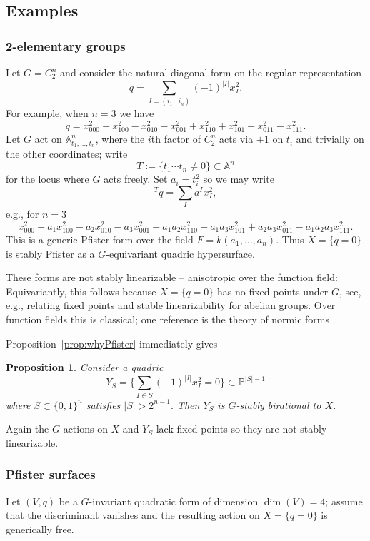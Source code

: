 \documentclass[12pt]{amsart}
\numberwithin{equation}{section}
\newcommand{\bA}{\mathbb{A}}
\newcommand{\bP}{\mathbb{P}}
\theoremstyle{plain}
\newtheorem{prop}{Proposition}[section]
\theoremstyle{definition}
\theoremstyle{remark}
\begin{document}
\subsection*{Examples} 
\label{sect:ASPF}

\subsubsection*{2-elementary groups}
Let $G=C_2^n$ and consider the natural diagonal form
on the regular representation
$$q=\sum_{I=(i_1\ldots i_n)}(-1)^{|I|} x_I^2.$$
For example, when $n=3$ we have
$$q = x_{000}^2 - x_{100}^2 - x_{010}^2 - x_{001}^2
+ x_{110}^2 + x_{101}^2 + x_{011}^2 - x_{111}^2.$$
Let $G$ act on $\bA^n_{t_1,\ldots,t_n}$, where the $i$th factor
of $C_2^n$ acts via $\pm 1$ on $t_i$ and trivially on the
other coordinates; write 
$$T:=\{t_1\cdots t_n \neq 0\}\subset \bA^n$$
for the locus where $G$ acts freely. Set $a_i=t_i^2$ so we may write
$${ }^Tq = \sum_I a^I x_I^2,$$
e.g., for $n=3$
$$
x_{000}^2 - a_1 x_{100}^2 - a_2x_{010}^2 - a_3x_{001}^2
+ a_1a_2x_{110}^2 + a_1a_3x_{101}^2 + a_2a_3x_{011}^2 - 
a_1a_2a_3 x_{111}^2.
$$
This is a generic Pfister form over the field $F=k(a_1,\ldots,a_n)$.
Thus $X=\{q=0\}$ is stably Pfister as a $G$-equivariant
quadric hypersurface.  

These forms are not stably linearizable -- anisotropic over the function
field:  
Equivariantly, this follows because $X=\{q=0\}$ has no fixed points
under $G$, see, e.g., \cite[\S 5 and Appendix]{RY} relating fixed points and stable linearizability for abelian groups.
Over function fields this is classical; one reference
is the theory of normic forms \cite[p.~377]{LangQAC}. 

Proposition~\ref{prop:whyPfister} immediately gives
\begin{prop}
Consider a quadric
$$Y_S=\{\sum_{I \in S} (-1)^{|I|} x_I^2=0\} \subset \bP^{|S|-1}$$
where $S \subset \{0,1\}^n$ satisfies $|S|>2^{n-1}.$
Then $Y_S$ is $G$-stably birational to $X$.  
\end{prop}
Again the $G$-actions on $X$ and $Y_S$ 
lack fixed points so they are not stably linearizable.

\subsubsection*{Pfister surfaces}
Let $(V,q)$ be a $G$-invariant quadratic form of dimension $\dim(V)=4$;
assume that the discriminant vanishes and the resulting
action on $X=\{q=0\}$ is generically free.
\end{document}
